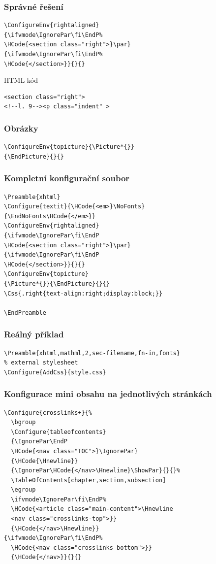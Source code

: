 \begin{frame}[fragile]
  \frametitle{Správné řešení}
  \begin{priklad}
\begin{verbatim}
\ConfigureEnv{rightaligned}
{\ifvmode\IgnorePar\fi\EndP%
\HCode{<section class="right">}\par}
{\ifvmode\IgnorePar\fi\EndP%
\HCode{</section>}}{}{}
\end{verbatim}
  \end{priklad}
  HTML kód

  \begin{verbatim}
<section class="right">
<!--l. 9--><p class="indent" >
  \end{verbatim}
\end{frame}

\begin{frame}[fragile]
  \frametitle{Obrázky}
  \begin{priklad}
\begin{verbatim}
\ConfigureEnv{topicture}{\Picture*{}}
{\EndPicture}{}{}
\end{verbatim}
\end{priklad}
\end{frame}

\begin{frame}[fragile]
  \frametitle{Kompletní konfigurační soubor}
  \begin{priklad}
    \small
    \begin{verbatim}
\Preamble{xhtml}
\Configure{textit}{\HCode{<em>}\NoFonts}
{\EndNoFonts\HCode{</em>}}
\ConfigureEnv{rightaligned}
{\ifvmode\IgnorePar\fi\EndP
\HCode{<section class="right">}\par}
{\ifvmode\IgnorePar\fi\EndP
\HCode{</section>}}{}{}
\ConfigureEnv{topicture}
{\Picture*{}}{\EndPicture}{}{}
\Css{.right{text-align:right;display:block;}}

\EndPreamble
  \end{verbatim}
  \end{priklad}
\end{frame}

\begin{frame}[fragile]
\frametitle{Reálný příklad}
\begin{verbatim}
\Preamble{xhtml,mathml,2,sec-filename,fn-in,fonts}
% external stylesheet
\Configure{AddCss}{style.css}
\end{verbatim}
\end{frame}

\begin{frame}[fragile]
  \frametitle{Konfigurace mini obsahu na jednotlivých stránkách}
  \small
  \begin{verbatim}
\Configure{crosslinks+}{%
  \bgroup
  \Configure{tableofcontents}
  {\IgnorePar\EndP
  \HCode{<nav class="TOC">}\IgnorePar}
  {\HCode{\Hnewline}}
  {\IgnorePar\HCode{</nav>\Hnewline}\ShowPar}{}{}%
  \TableOfContents[chapter,section,subsection]
  \egroup
  \ifvmode\IgnorePar\fi\EndP%
  \HCode{<article class="main-content">\Hnewline
  <nav class="crosslinks-top">}}
  {\HCode{</nav>\Hnewline}}
{\ifvmode\IgnorePar\fi\EndP%
  \HCode{<nav class="crosslinks-bottom">}}
  {\HCode{</nav>}}{}{}
  \end{verbatim}
\end{frame}

